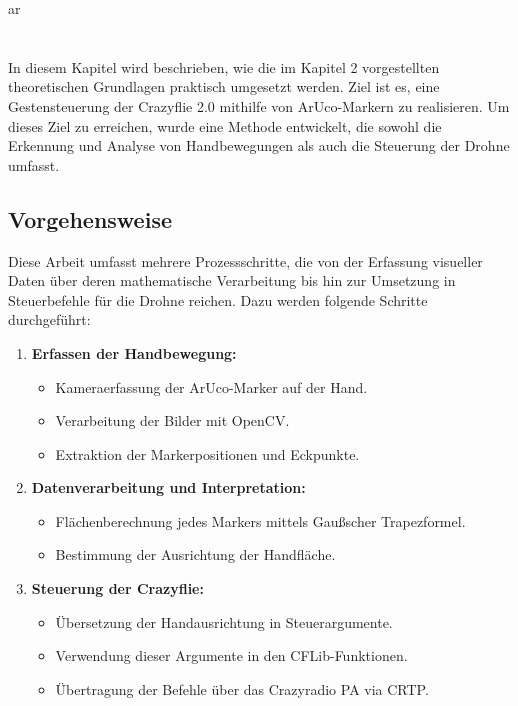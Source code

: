 ar\chapter{\chapThree}
\label{cha:chapter3} %

\begingroup
\fontsize{12pt}{14pt}\selectfont

In diesem Kapitel wird beschrieben, wie die im Kapitel 2 vorgestellten theoretischen Grundlagen praktisch umgesetzt werden.
Ziel ist es, eine Gestensteuerung der Crazyflie 2.0 mithilfe von ArUco-Markern zu realisieren.
Um dieses Ziel zu erreichen, wurde eine Methode entwickelt, die sowohl die Erkennung und Analyse von Handbewegungen als auch die Steuerung der Drohne umfasst.

\section{Vorgehensweise}

Diese Arbeit umfasst mehrere Prozessschritte, die von der Erfassung visueller Daten über deren mathematische Verarbeitung bis hin zur Umsetzung in Steuerbefehle für die Drohne reichen.
Dazu werden folgende Schritte durchgeführt:

\begin{enumerate}
    \item \textbf{Erfassen der Handbewegung:}
    \begin{itemize}
        \item Kameraerfassung der ArUco-Marker auf der Hand.
        \item Verarbeitung der Bilder mit OpenCV.
        \item Extraktion der Markerpositionen und Eckpunkte.
    \end{itemize}
    \item \textbf{Datenverarbeitung und Interpretation:}
    \begin{itemize}
        \item Flächenberechnung jedes Markers mittels Gaußscher Trapezformel.
        \item Bestimmung der Ausrichtung der Handfläche.
    \end{itemize}
    \item \textbf{Steuerung der Crazyflie:}
    \begin{itemize}
        \item Übersetzung der Handausrichtung in Steuerargumente.
        \item Verwendung dieser Argumente in den CFLib-Funktionen.
        \item Übertragung der Befehle über das Crazyradio PA via CRTP.
    \end{itemize}
\end{enumerate}

